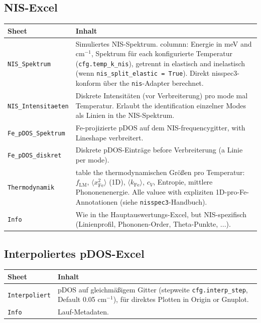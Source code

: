 \documentclass[11pt,a4paper,twoside]{article}
\newcommand{\fLM}{f_{\mathrm{LM}}}
\newcommand{\Fei}{\mathrm{Fe}}
\theoremstyle{remark}
\begin{document}
\subsection{NIS-Excel}

\begin{longtable}{p{} p{}}
\toprule
\textbf{Sheet} & \textbf{Inhalt} \\
\midrule
\endhead

\texttt{NIS\_Spektrum} & Simuliertes NIS-Spektrum. columnn: Energie
  in meV and cm$^{-1}$, Spektrum f\"ur each konfigurierte Temperatur
  (\texttt{cfg.temp\_k\_nis}), getrennt in elastisch and inelastisch
  (wenn \texttt{nis\_split\_elastic = True}). Direkt nisspec3-konform
  \"uber the \texttt{nis}-Adapter berechnet. \\

\texttt{NIS\_Intensitaeten} & Diskrete Intensit\"aten (vor Verbreiterung)
  pro mode mal Temperatur. Erlaubt the identification einzelner
  Modes als Linien in the NIS-Spektrum. \\

\texttt{Fe\_pDOS\_Spektrum} & Fe-projizierte pDOS auf dem
  NIS-frequencygitter, with Lineshape verbreitert. \\

\texttt{Fe\_pDOS\_diskret} & Diskrete pDOS-Eintr\"age before Verbreiterung
  (a Linie per mode). \\

\texttt{Thermodynamik} & table the thermodynamischen Gr\"o\ss en pro
  Temperatur: $\fLM$, $\langle x^2_\Fei\rangle$ (1D),
  $\langle k_\Fei\rangle$, $c_V$, Entropie, mittlere Phononenenergie.
  Alle valuee with expliziten 1D-pro-Fe-Annotationen
  (siehe \texttt{nisspec3}-Handbuch). \\

\texttt{Info} & Wie in the Hauptauswertungs-Excel, but NIS-spezifisch
  (Linienprofil, Phononen-Order, Theta-Punkte, ...). \\
\bottomrule
\end{longtable}

\subsection{Interpoliertes pDOS-Excel}

\begin{longtable}{p{} p{}}
\toprule
\textbf{Sheet} & \textbf{Inhalt} \\
\midrule
\endhead

\texttt{Interpoliert} & pDOS auf gleichm\"a\ss igem Gitter (stepweite
  \texttt{cfg.interp\_step}, Default 0.05 cm$^{-1}$), f\"ur direktes
  Plotten in Origin or Gnuplot. \\

\texttt{Info} & Lauf-Metadaten. \\
\bottomrule
\end{longtable}
\end{document}
